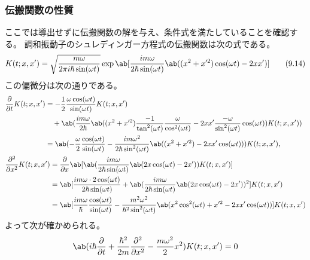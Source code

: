 \subsubsection{伝搬関数の性質}

ここでは導出せずに伝搬関数の解を与え、条件式を満たしていることを確認する。
調和振動子のシュレディンガー方程式の伝搬関数は次の式である。
\begin{equation}
  \label{eq:propagator_solution}
  K(t;x,x')
  =\sqrt{\frac{m\omega}{2\pi i\hbar\sin(\omega t)}}
  \exp\ab[
    \frac{im\omega}{2\hbar\sin(\omega t)}
    \ab(
    (x^2+x'^2)\cos(\omega t) -2xx'
    )
  ]
  \tag{9.14}
\end{equation}
この偏微分は次の通りである。
\begin{align}
   & \begin{aligned}
       \pdv{}{t}K(t;x,x')
        & =-\frac{1}{2}\frac{\omega\cos(\omega t)}{\sin(\omega t)}K(t;x,x') \\
        & \quad+\ab(
       \frac{im\omega}{2\hbar}\ab(
       (x^2+x'^2)\frac{-1}{\tan^2(\omega t)}\frac{\omega}{\cos^2(\omega t)}
       -2xx'\frac{-\omega}{\sin^2(\omega t)}\cos(\omega t)
       )K(t;x,x')
       )                                                                    \\
        & =\ab(
       -\frac{\omega}{2}\frac{\cos(\omega t)}{\sin(\omega t)}
       -\frac{im\omega^2}{2\hbar\sin^2(\omega t)}\ab(
       (x^2+x'^2)-2xx'\cos(\omega t)
       )
       )K(t;x,x'),
     \end{aligned} \\
   & \begin{aligned}
       \pdv[order={2}]{}{x}K(t;x,x')
        & =\pdv{}{x}\ab[
         \ab(\frac{im\omega}{2\hbar\sin(\omega t)}\ab(2x\cos(\omega t)-2x'))
         K(t;x,x')
       ]                 \\
        & =
       \ab[
         \frac{im\omega\cdot2\cos(\omega t)}{2\hbar\sin(\omega t)}
         +\ab(\frac{im\omega}{2\hbar\sin(\omega t)}\ab(2x\cos(\omega t)-2x'))^2
       ]K(t;x,x')        \\
        & =\ab[
         \frac{im\omega}{\hbar}\frac{\cos(\omega t)}{\sin(\omega t)}
         -\frac{m^2\omega^2}{\hbar^2\sin^2(\omega t)}
         \ab(x^2\cos^2(\omega t)+x'^2-2xx'\cos(\omega t))
       ]K(t;x,x')
     \end{aligned}
\end{align}
よって次が確かめられる。
\begin{equation}
  \ab(
  i\hbar\pdv{}{t}+\frac{\hbar^2}{2m}
  \pdv[order={2}]{}{x}-\frac{m\omega^2}{2}x^2
  )K(t;x,x')=0
\end{equation}

